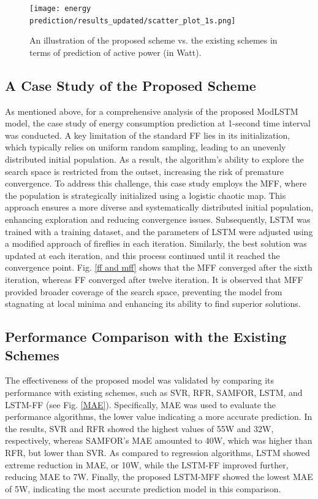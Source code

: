 \documentclass[journal]{IEEEtran}
\begin{document}
\begin{figure}[!h]
	\centering
	\texttt{[image: energy prediction/results\_updated/scatter\_plot\_1s.png]}
	\caption{An illustration of the proposed scheme vs. the existing schemes in terms of prediction of active power (in Watt).}
	\label{SCATTER PLOT}
	\vspace{-15pt}
\end{figure}
\subsection{A Case Study of the Proposed Scheme}
As mentioned above, for a comprehensive analysis of the proposed ModLSTM model, the case study of energy consumption prediction at 1-second time interval was conducted. A key limitation of the standard FF lies in its initialization, which typically relies on uniform random sampling, leading to an unevenly distributed initial population. As a result, the algorithm's ability to explore the search space is restricted from the outset, increasing the risk of premature convergence. To address this challenge, this case study employs the MFF, where the population is strategically initialized using a logistic chaotic map. This approach ensures a more diverse and systematically distributed initial population, enhancing exploration and reducing convergence issues. Subsequently, LSTM was trained with a training dataset, and the parameters of LSTM were adjusted using a modified approach of fireflies in each iteration. Similarly, the best solution was updated at each iteration, and this process continued until it reached the convergence point. Fig. \ref{ff and mff} shows that the MFF converged after the sixth iteration, whereas FF converged after twelve iteration. It is observed that MFF provided broader coverage of the search space, preventing the model from stagnating at local minima and enhancing its ability to find superior solutions.







\subsection{Performance Comparison with the Existing Schemes }

The effectiveness of the proposed model was validated by comparing its performance with existing schemes, such as SVR, RFR, SAMFOR, LSTM, and LSTM-FF (see Fig. \ref{MAE}). Specifically, MAE was used to evaluate the performance algorithms, the lower value indicating a more accurate prediction. In the results, SVR and RFR showed the highest values of 55W and 32W, respectively, whereas SAMFOR's MAE amounted to 40W, which was higher than RFR, but lower than SVR. As compared to regression algorithms, LSTM showed extreme reduction in MAE, or 10W, while the LSTM-FF improved further, reducing MAE to 7W. Finally, the proposed LSTM-MFF showed the lowest MAE of 5W, indicating the most accurate prediction model in this comparison. 
\end{document}
